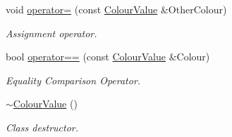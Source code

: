 \begin{DoxyCompactItemize}
void \hyperlink{classMezzanine_1_1ColourValue_a70b630832bc4db2c47a45c1ca8b06581}{operator=} (const \hyperlink{classMezzanine_1_1ColourValue}{ColourValue} \&OtherColour)
\begin{DoxyCompactList}\small\item\em Assignment operator. \item\end{DoxyCompactList}\item 
bool \hyperlink{classMezzanine_1_1ColourValue_a02b963ef5c928b35b3347f94bb074e12}{operator==} (const \hyperlink{classMezzanine_1_1ColourValue}{ColourValue} \&Colour)
\begin{DoxyCompactList}\small\item\em Equality Comparison Operator. \item\end{DoxyCompactList}\item 
\hypertarget{classMezzanine_1_1ColourValue_a4bb04f63fb5f8d70e0606240e257133b}{
\hyperlink{classMezzanine_1_1ColourValue_a4bb04f63fb5f8d70e0606240e257133b}{$\sim$ColourValue} ()}
\label{classMezzanine_1_1ColourValue_a4bb04f63fb5f8d70e0606240e257133b}

\begin{DoxyCompactList}\small\item\em Class destructor. \item\end{DoxyCompactList}\end{DoxyCompactItemize}
